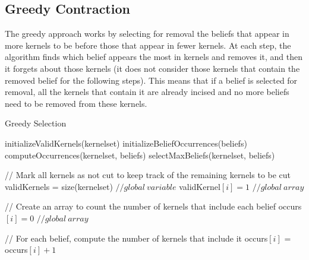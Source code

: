\subsection{Greedy Contraction}
The greedy approach works by selecting for removal the beliefs that appear in more kernels to be before those that appear in fewer kernels. At each step, the algorithm finds which belief appears the most in kernels and removes it, and then it forgets about those kernels (it does not consider those kernels that contain the removed belief for the following steps). This means that if a belief is selected for removal, all the kernels that contain it are already incised and no more beliefs need to be removed from these kernels.

\begin{algorithm}
\caption{Greedy Selection}
\label{GreedyAlgorithm}
\begin{algorithmic}[1]
\State initializeValidKernels(kernelset)
\State initializeBeliefOccurrences(beliefs)
\State computeOccurrences(kernelset, beliefs)
\State \Return selectMaxBeliefs(kernelset, beliefs)
\EndFunction
\end{algorithmic}

\begin{algorithmic}[1]
\State // Mark all kernels as not cut to keep track of the remaining kernels to be cut
\State validKernels = size(kernelset) $// global \: variable$
\State validKernel$[i] = 1$  $// global \: array$
\EndFor
\EndFunction
\end{algorithmic}

\begin{algorithmic}[1]
\State // Create an array to count the number of kernels that include each belief
\State occurs$[i] = 0$  $// global \: array$
\EndFor
\EndFunction
\end{algorithmic}

\begin{algorithmic}[1]
\State // For each belief, compute the number of kernels that include it
\State occurs$[i]$ = occurs$[i] + 1$
\EndIf
\EndFor
\EndFor
\EndFunction
\end{algorithmic}
\end{algorithm}

